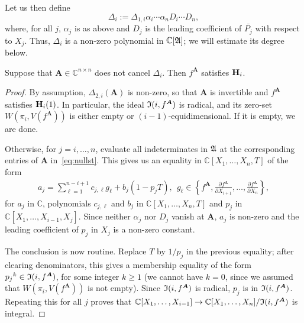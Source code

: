 \documentclass[sigconf]{acmart}
\def\mA{{\bm A}}
\def\pjb{\overline{P_{j}}}
\def\C{\mathbb{C}}
\def\D{\Delta}
\def\I{\frak{I}}
\def\A{\frak{A}}
\begin{document}
Let us then define 
$$\D_{i}:=\D_{1,i} \alpha_i \cdots \alpha_n D_i \cdots D_n,$$
where, for all $j$, $\alpha_j$ is as above and $D_j$ is the leading
coefficient of $\pjb$ with respect to $X_j$. Thus, $\D_{i}$ is a
non-zero polynomial in $\C[\A]$; we will estimate its degree below.

\begin{lemma}
  Suppose that $\mA \in \C^{n\times n}$ does not cancel
  $\D_{i}$. Then $f^\mA$ satisfies ${\bf H}_i$.
\end{lemma}
\begin{proof}
  By assumption, $\D_{2,i}(\mA)$ is non-zero, so that $\mA$ is
  invertible and $f^\mA$ satisfies ${\bf H}_i(1)$. In particular, the
  ideal $\I(i, f^\mA)$ is radical, and its zero-set
  $W(\pi_i,V(f^\mA))$ is either empty or $(i-1)$-equidimensional. If it is 
  empty, we are done. 

  Otherwise, for $j=i,\dots,n$, evaluate all indeterminates in $\A$ at the
  corresponding entries of $\mA$ in~\eqref{eq:nullst}. This gives us
  an equality in $\C[X_1,\dots,X_n,T]$ of the form
  \begin{align*}
    a_j = \sum_{\ell=1}^{n-i+1} c_{j,\ell} g_\ell + b_j (1-p_j T),\ \  g_\ell \in 
    \left\{ 
      f^\mA,\frac{\partial f^\mA}{\partial X_{i+1}},\hdots,\frac{\partial f^\mA}{\partial X_n}
    \right\},
  \end{align*}
  for $a_j$ in $\C$, polynomials $c_{j,\ell}$ and $b_j$ in
  $\C[X_1,\dots,X_n,T]$ and $p_j$ in
  $\C[X_1,\dots,X_{i-1},X_j]$. Since neither $\alpha_j$ nor $D_j$
  vanish at $\mA$, $a_j$ is non-zero and the leading coefficient of
  $p_j$ in $X_j$ is a non-zero constant.

  The conclusion is now routine. Replace $T$ by $1/p_j$ in the
  previous equality; after clearing denominators, this gives a
  membership equality of the form $p_j{}^k \in \I(i, f^\mA)$, for some
  integer $k \ge 1$ (we cannot have $k=0$, since we assumed that
  $W(\pi_i,V(f^\mA))$ is not empty). Since $\I(i, f^\mA)$ is radical,
  $p_j$ is in $\I(i, f^\mA)$. Repeating this for all $j$ proves that 
  $\C[X_1,\dots,X_{i-1}]\rightarrow\C[X_1,\dots,X_n]/\I(i, f^\mA)$
  is integral.
\end{proof}
\end{document}
